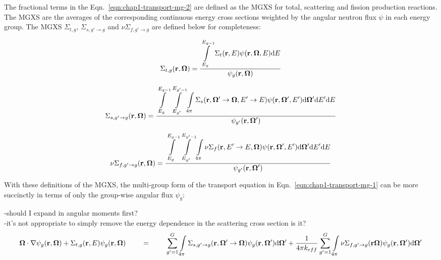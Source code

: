 The fractional terms in the Eqn.~\ref{eqn:chap1-transport-mg-2} are defined as the \ac{MGXS} for total, scattering and fission production reactions. The \ac{MGXS} are the averages of the corresponding continuous energy cross sections weighted by the angular neutron flux $\psi$ in each energy group. The \ac{MGXS} $\Sigma_{t,g}$, $\Sigma_{s,g' \rightarrow g}$ and $\nu\Sigma_{f,g' \rightarrow g}$ are defined below for completeness:

\begin{dmath}
\label{eqn:chap1-sigt-mg}
\Sigma_{t,g}(\mathbf{r},\mathbf{\Omega}) = \ddfrac{\int\displaylimits_{E_{g}}^{E_{g-1}} \Sigma_{t}(\mathbf{r},E)\psi(\mathbf{r},\mathbf{\Omega},E)\mathrm{d}E}{\psi_{g}(\mathbf{r},\mathbf{\Omega})}
\end{dmath}

\begin{dmath}
\label{eqn:chap1-sigs-mg}
\Sigma_{s,g' \rightarrow g}(\mathbf{r},\mathbf{\Omega}) = \ddfrac{\int\displaylimits_{E_{g}}^{E_{g-1}} \int\displaylimits_{E_{g'}}^{E_{g'-1}}\int\displaylimits_{4\pi} \Sigma_{s}(\mathbf{r},{\mathbf{\Omega'}\rightarrow\mathbf{\Omega}},{E'\rightarrow E}) \psi(\mathbf{r},\mathbf{\Omega'},E') \mathrm{d}\mathbf{\Omega'} \mathrm{d}E' \mathrm{d}E} {\psi_{g'}(\mathbf{r},\mathbf{\Omega'})}
\end{dmath}

\begin{dmath}
\label{eqn:chap1-nusigf-mg}
\nu\Sigma_{f,g' \rightarrow g}(\mathbf{r},\mathbf{\Omega}) = \ddfrac{\int\displaylimits_{E_{g}}^{E_{g-1}} \int\displaylimits_{E_{g'}}^{E_{g'-1}}\int\displaylimits_{4\pi} \nu\Sigma_{f}(\mathbf{r},{E'\rightarrow E},\mathbf{\Omega})\psi(\mathbf{r},\mathbf{\Omega'},E') \mathrm{d}\mathbf{\Omega'} \mathrm{d}E'\mathrm{d}E}{\psi_{g'}(\mathbf{r},\mathbf{\Omega'})}
\end{dmath}

With these definitions of the \ac{MGXS}, the multi-group form of the transport equation in Eqn.~\ref{eqn:chap1-transport-mg-1} can be more succinctly in terms of only the group-wise angular flux $\psi_{g}$:

-should I expand in angular moments first?\\
-it's not appropriate to simply remove the energy dependence in the scattering cross section is it?\\

\begin{dmath}
\label{eqn:chap1-transport-mg-3}
\mathbf{\Omega} \cdot \nabla \psi_{g}(\mathbf{r},\mathbf{\Omega}) + \Sigma_{t,g}(\mathbf{r},E)\psi_{g}(\mathbf{r},\mathbf{\Omega}) \;\;\;\;\;\;\;\; = \;\;\;\;\;\;\;\; 
\sum_{g'=1}^{G} \int\displaylimits_{4\pi} \Sigma_{s,g' \rightarrow g}(\mathbf{r},{\mathbf{\Omega'}\rightarrow\mathbf{\Omega}}) \psi_{g}(\mathbf{r},\mathbf{\Omega'}) \mathrm{d}\mathbf{\Omega'} + 
\frac{1}{4\pi k_{eff}}\sum_{g'=1}^{G} \int\displaylimits_{4\pi} \nu\Sigma_{f,g' \rightarrow g}(\mathbf{r}\mathbf{\Omega})\psi_{g}(\mathbf{r},\mathbf{\Omega'}) \mathrm{d}\mathbf{\Omega'}
\end{dmath}

